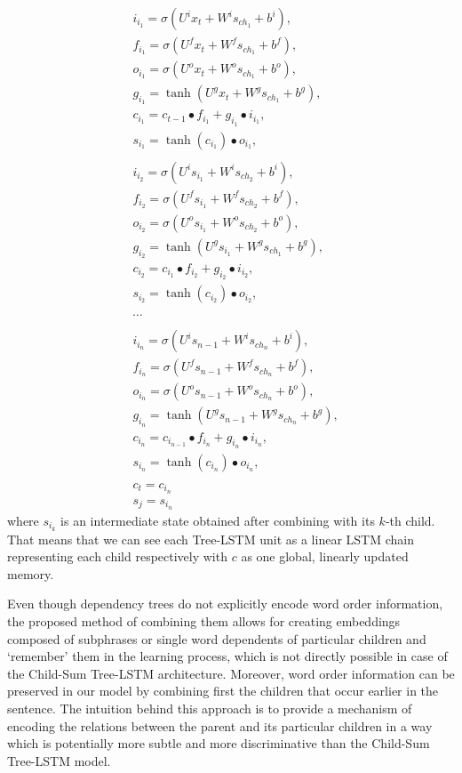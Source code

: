 \documentclass[10pt, a4paper]{article}
\begin{document}
\begin{equation}
\begin{split}
&i_{i_1} = \sigma(U^i{x_t} + W^i{s_{ch_1}} + b^i) ,\\
&f_{i_1} = \sigma(U^f{x_t} + W^f{s_{ch_1}} + b^f) ,\\
&o_{i_1} = \sigma(U^o{x_t} + W^o{s_{ch_1}} + b^o) ,\\
&g_{i_1} = \tanh(U^g{x_t}+ W^g{s_{ch_1}} + b^g) ,\\
&c_{i_1} = c_{t-1} \bullet f_{i_1} + g_{i_1} \bullet i_{i_1} ,\\
&s_{i_1} = \tanh({c_{i_1}}) \bullet o_{i_1},\\\\
&i_{i_2} = \sigma(U^is_{i_1} + W^is_{ch_2} + b^i) ,\\
&f_{i_2} = \sigma(U^fs_{i_1} + W^fs_{ch_2} + b^f) ,\\
&o_{i_2} = \sigma(U^os_{i_1} + W^os_{ch_2} + b^o) ,\\
&g_{i_2} = \tanh(U^gs_{i_1}+ W^gs_{ch_1} + b^g) ,\\
&c_{i_2} = c_{i_1} \bullet f_{i_2} + g_{i_2} \bullet i_{i_2} ,\\
&s_{i_2} = \tanh(c_{i_2}) \bullet o_{i_2},\\\\
&\cdots\\\\
&i_{i_n} = \sigma(U^is_{{n-1}} + W^is_{ch_{n}} + b^i) ,\\
&f_{i_n} = \sigma(U^fs_{{n-1}} + W^fs_{ch_{n}} + b^f) ,\\
&o_{i_n} = \sigma(U^os_{{n-1}} + W^os_{ch_{n}} + b^o) ,\\
&g_{i_n} = \tanh(U^gs_{{n-1}}+ W^gs_{ch_{n}} + b^g) ,\\
&c_{i_n} = c_{i_{n-1}} \bullet f_{i_n} + g_{i_n} \bullet i_{i_n} ,\\
&s_{i_n} = \tanh(c_{i_n}) \bullet o_{i_n},\\\\
&c_{t} = c_{i_n}\\
&s_{j} = s_{i_n}
\end{split}
\end{equation}
	where $s_{i_k}$ is an intermediate state obtained after combining with its $k$-th child. That means that we can see each Tree-LSTM unit as a linear LSTM chain representing each child respectively with $c$ as one global, linearly updated memory.
\par Even though dependency trees do not explicitly encode word order information, the proposed method of combining them allows for creating embeddings composed of subphrases or single word dependents of particular children and `remember' them in the learning process, which is not directly possible in case of the Child-Sum Tree-LSTM architecture. Moreover, word order information can be preserved in our model by combining first the children that occur earlier in the sentence. The intuition behind this approach is to provide a mechanism of encoding  the relations between the parent and its particular children in a way which is potentially more subtle and more discriminative than the Child-Sum Tree-LSTM model.
\end{document}
